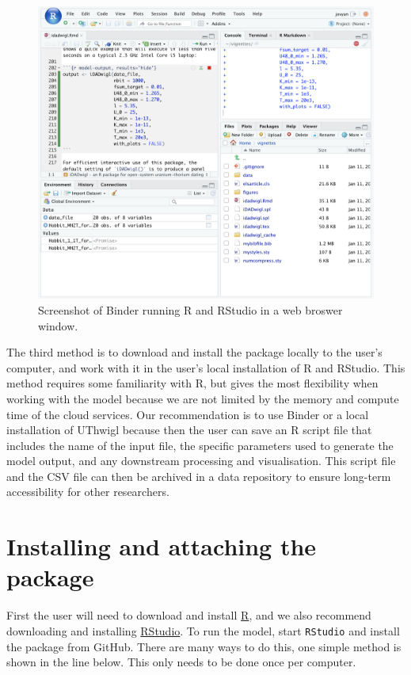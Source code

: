 \documentclass[]{elsarticle} %
\begin{document}
\begin{figure}
\includegraphics[width=0.95\linewidth]{figures/binder} \caption{Screenshot of Binder running R and RStudio in a web broswer window.}\label{fig:binderfig}
\end{figure}

The third method is to download and install the package locally to the user's computer, and work with it in the user's local installation of R and RStudio. This method requires some familiarity with R, but gives the most flexibility when working with the model because we are not limited by the memory and compute time of the cloud services. Our recommendation is to use Binder or a local installation of UThwigl because then the user can save an R script file that includes the name of the input file, the specific parameters used to generate the model output, and any downstream processing and visualisation. This script file and the CSV file can then be archived in a data repository to ensure long-term accessibility for other researchers.

\hypertarget{installing-and-attaching-the-package}{%
\section{Installing and attaching the package}\label{installing-and-attaching-the-package}}

First the user will need to download and install \href{https://www.r-project.org/}{R}, and we also recommend downloading and installing \href{https://www.rstudio.com/}{RStudio}. To run the model, start \texttt{RStudio} and install the package from GitHub. There are many ways to do this, one simple method is shown in the line below. This only needs to be done once per computer.
\end{document}

